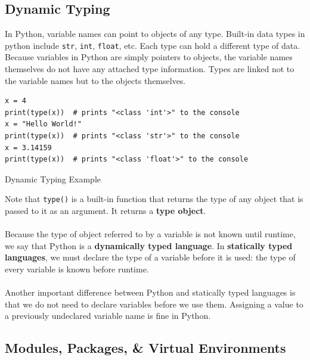 \documentclass[a4paper,11pt]{article}
\newenvironment{code}{\captionsetup{type=listing}}{}
\begin{document}
\subsection{Dynamic Typing}
In Python, variable names can point to objects of any type.
Built-in data types in python include \texttt{str}, \texttt{int}, \texttt{float}, 
etc.
Each type can hold a different type of data.
Because variables in Python are simply pointers to objects, the variable names themselves do not have any attached
type information.
Types are linked not to the variable names but to the objects themselves.

\begin{code}
\begin{verbatim}
x = 4
print(type(x))  # prints "<class 'int'>" to the console
x = "Hello World!"
print(type(x))  # prints "<class 'str'>" to the console
x = 3.14159
print(type(x))  # prints "<class 'float'>" to the console
\end{verbatim}
\caption{Dynamic Typing Example}
\end{code}

Note that \texttt{type()} is a built-in function that returns the type of any object that is passed to 
it as an argument.
It returns a \textbf{type object}.
\\\\
Because the type of object referred to by a variable is not known until runtime, we say that Python is a 
\textbf{dynamically typed language}.
In \textbf{statically typed languages}, we must declare the type of a variable before it is used: the type of 
every variable is known before runtime.
\\\\
Another important difference between Python and statically typed languages is that we do not need to declare 
variables before we use them.
Assigning a value to a previously undeclared variable name is fine in Python.

\subsection{Modules, Packages, \& Virtual Environments}
\end{document}
